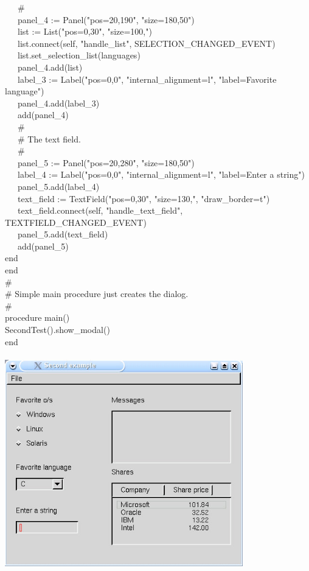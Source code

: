 {\>   \ \ \ \# \\
\>   \ \ \ panel\_4 := Panel("pos=20,190",
"size=180,50") \\
\>   \ \ \ list := List("pos=0,30", "size=100,") \\
\>   \ \ \ list.connect(self,
"handle\_list", SELECTION\_CHANGED\_EVENT) \\
\>   \ \ \ list.set\_selection\_list(languages) \\
\>   \ \ \ panel\_4.add(list) \\
\>   \ \ \ label\_3 := Label("pos=0,0", "internal\_alignment=l",
"label=Favorite language") \\
\>   \ \ \ panel\_4.add(label\_3) \\
\>   \ \ \ add(panel\_4) \\
\>   \ \ \ \# \\
\>   \ \ \ \# The text field. \\
\>   \ \ \ \# \\
\>   \ \ \ panel\_5 := Panel("pos=20,280",
"size=180,50") \\
\>   \ \ \ label\_4 := Label("pos=0,0",
"internal\_alignment=l",
"label=Enter a string") \\
\>   \ \ \ panel\_5.add(label\_4) \\
\>   \ \ \ text\_field :=
TextField("pos=0,30",
"size=130,",
"draw\_border=t") \\
\>   \ \ \ text\_field.connect(self,
"handle\_text\_field",
TEXTFIELD\_CHANGED\_EVENT) \\
\>   \ \ \ panel\_5.add(text\_field) \\
\>   \ \ \ add(panel\_5) \\
\>   end \\
end \\
\# \\
\# Simple main procedure just creates the dialog. \\
\# \\
procedure main() \\
\>   SecondTest().show\_modal() \\
end
}


\begin{center}
\includegraphics[width=4.0756in,height=3.6465in]{ub-img/ub-img51.jpg}
\end{center}

